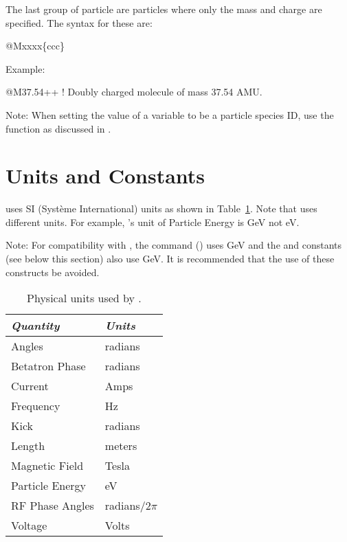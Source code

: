 {{{The last group of particle are particles where only the mass and charge are specified.  The syntax
for these are:
\begin{example}
  @Mxxxx\{ccc\}
\end{example}
Example:
\begin{example}
  @M37.54++    ! Doubly charged molecule of mass 37.54 AMU.
\end{example}

Note: When setting the value of a variable to be a particle species ID, use the  function as discussed
in .

\newpage

\section{Units and Constants}
\label{s:constants}

\bmad uses SI (Syst\`eme International) units as shown in Table~\ref{t:units}.  Note that \mad uses
different units. For example, \mad's unit of Particle Energy is GeV not eV. 

Note: For compatibility with \mad, the  command () uses GeV
and the  and  constants (see below this section) also use GeV. It is recommended that
the use of these constructs be avoided.

\begin{table}[ht]
\centering
\begin{tabular}{ll} \toprule
  {\em Quantity}     & {\em Units}       \\ \midrule
  Angles             &    radians        \\ 
  Betatron Phase     &    radians        \\
  Current            &    Amps           \\ 
  Frequency          &    Hz             \\ 
  Kick               &    radians        \\ 
  Length             &    meters         \\ 
  Magnetic Field     &    Tesla          \\ 
  Particle Energy    &    eV             \\ 
  RF Phase Angles    &    radians/2$\pi$ \\ 
  Voltage            &    Volts          \\ \bottomrule
\end{tabular}
\caption{Physical units used by \bmad.}
\label{t:units}
\end{table}

}}}

